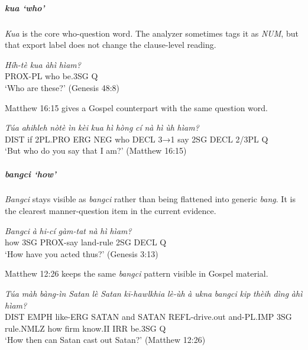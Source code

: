 \documentclass[
  11pt,
  a4paper,
]{article}
\newcommand{\tdim}[1]{\textit{#1}}
\newcommand{\tdimword}[1]{\textit{#1}}
\renewcommand{\textsc}[1]{{\footnotesize\MakeUppercase{#1}}}
\newcommand{\glossquote}[1]{`#1'}
\begin{document}
\subparagraph{\texorpdfstring{\tdim{kua}
\glossquote{who}}{ }}\label{section-1}

\tdim{Kua} is the core who-question word. The analyzer sometimes tags it
as \tdim{NUM}, but that export label does not change the clause-level
reading.

\begin{exe}
\ex \label{ex:int-kua-gen48-8}
\gll \tdimword{Híh-tè} \tdimword{kua} \tdimword{àhì} \tdimword{hìam?} \\
     \textsc{prox}-\textsc{pl} who be.\textsc{3sg} \textsc{q} \\
\glt \glossquote{Who are these?} (Genesis 48:8)
\end{exe}

Matthew 16:15 gives a Gospel counterpart with the same question word.

\begin{exe}
\ex \label{ex:int-kua-matt16-15}
\gll \tdimword{Túa} \tdimword{ahihleh} \tdimword{nòtè} \tdimword{ìn} \tdimword{kèi} \tdimword{kua} \tdimword{hì} \tdimword{hòng} \tdimword{cí} \tdimword{nà} \tdimword{hì} \tdimword{ùh} \tdimword{hìam?} \\
     \textsc{dist} if \textsc{2pl}.\textsc{pro} \textsc{erg} \textsc{neg} who \textsc{decl} \textsc{3→1} say \textsc{2sg} \textsc{decl} 2/3PL \textsc{q} \\
\glt \glossquote{But who do you say that I am?} (Matthew 16:15)
\end{exe}

\subparagraph{\texorpdfstring{\tdim{bangci}
\glossquote{how}}{ }}\label{section-2}

\tdim{Bangci} stays visible as \tdim{bangci} rather than being flattened
into generic \tdim{bang}. It is the clearest manner-question item in the
current evidence.

\begin{exe}
\ex \label{ex:int-bangci-gen3-13}
\gll \tdimword{Bangci} \tdimword{à} \tdimword{hi-cí} \tdimword{gàm-tat} \tdimword{nà} \tdimword{hì} \tdimword{hìam?} \\
     how \textsc{3sg} \textsc{prox}-say land-rule \textsc{2sg} \textsc{decl} \textsc{q} \\
\glt \glossquote{How have you acted thus?} (Genesis 3:13)
\end{exe}

Matthew 12:26 keeps the same \tdim{bangci} pattern visible in Gospel
material.

\begin{exe}
\ex \label{ex:int-bangci-matt12-26}
\gll \tdimword{Túa} \tdimword{màh} \tdimword{bàng-ìn} \tdimword{Satan} \tdimword{lè} \tdimword{Satan} \tdimword{kī-hawlkhia} \tdimword{lè-ùh} \tdimword{à} \tdimword{ukna} \tdimword{bangci} \tdimword{kip} \tdimword{thèih} \tdimword{dìng} \tdimword{àhì} \tdimword{hìam?} \\
     \textsc{dist} \textsc{emph} like-\textsc{erg} \textsc{satan} and \textsc{satan} \textsc{refl}-drive.out and-\textsc{pl}.\textsc{imp} \textsc{3sg} rule.\textsc{nmlz} how firm know.\textsc{ii} \textsc{irr} be.\textsc{3sg} \textsc{q} \\
\glt \glossquote{How then can Satan cast out Satan?} (Matthew 12:26)
\end{exe}
\end{document}
